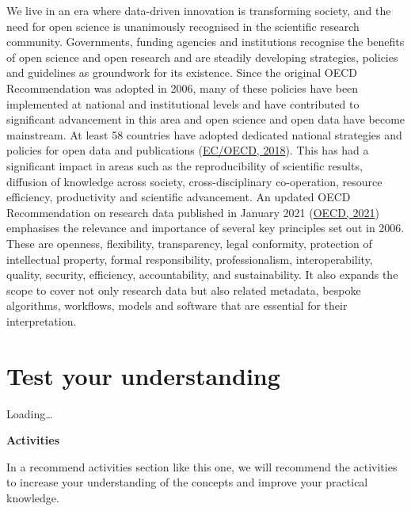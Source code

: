 \documentclass[
]{book}
\begin{document}
We live in an era where data-driven innovation is transforming society, and the need for open science is unanimously recognised in the scientific research community. Governments, funding agencies and institutions recognise the benefits of open science and open research and are steadily developing strategies, policies and guidelines as groundwork for its existence. Since the original OECD Recommendation was adopted in 2006, many of these policies have been implemented at national and institutional levels and have contributed to significant advancement in this area and open science and open data have become mainstream. At least 58 countries have adopted dedicated national strategies and policies for open data and publications (\href{https://stip.oecd.org/stip.html}{EC/OECD, 2018}). This has had a significant impact in areas such as the reproducibility of scientific results, diffusion of knowledge across society, cross-disciplinary co-operation, resource efficiency, productivity and scientific advancement. An updated OECD Recommendation on research data published in January 2021 (\href{https://www.oecd.org/sti/recommendation-access-to-research-data-from-public-funding.htm\#:~:text=On\%2020\%20January\%202021\%2C\%20the,shown\%20in\%20the\%20figure\%20below.}{OECD, 2021}) emphasises the relevance and importance of several key principles set out in 2006. These are openness, flexibility, transparency, legal conformity, protection of intellectual property, formal responsibility, professionalism, interoperability, quality, security, efficiency, accountability, and sustainability. It also expands the scope to cover not only research data but also related metadata, bespoke algorithms, workflows, models and software that are essential for their interpretation.

\hypertarget{test-your-understanding-1}{%
\section{Test your understanding}\label{test-your-understanding-1}}

Loading\ldots{}

\textbf{Activities}

In a recommend activities section like this one, we will recommend the activities to increase your understanding of the concepts and improve your practical knowledge.
\end{document}
